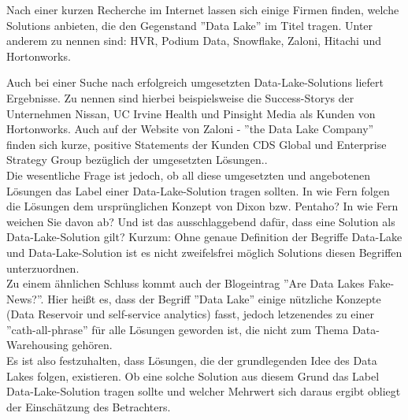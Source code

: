 \documentclass[twoside,twocolumn]{article}
\begin{document}
Nach einer kurzen Recherche im Internet lassen sich einige Firmen finden, welche Solutions anbieten, die den Gegenstand ''Data Lake'' im Titel tragen. Unter anderem zu nennen sind: HVR, Podium Data, Snowflake, Zaloni\cite{c1}, Hitachi\cite{c2} und Hortonworks\cite{c3}.

Auch bei einer Suche nach erfolgreich umgesetzten Data-Lake-Solutions liefert Ergebnisse. 
Zu nennen sind hierbei beispielsweise die Success-Storys der Unternehmen Nissan\cite{s1}, UC Irvine Health\cite{s2} und Pinsight Media\cite{s3} als Kunden von Hortonworks. Auch auf der Website von Zaloni - ''the Data Lake Company'' finden sich kurze, positive Statements der Kunden CDS Global und Enterprise Strategy Group bezüglich der umgesetzten Lösungen.\cite{s4}.\\

Die wesentliche Frage ist jedoch, ob all diese umgesetzten und angebotenen Lösungen das Label einer Data-Lake-Solution tragen sollten. In wie Fern folgen die Lösungen dem ursprünglichen Konzept von Dixon bzw. Pentaho? In wie Fern weichen Sie davon ab? Und ist das ausschlaggebend dafür, dass eine Solution als Data-Lake-Solution gilt? Kurzum: Ohne genaue Definition der Begriffe Data-Lake und Data-Lake-Solution ist es nicht zweifelsfrei möglich Solutions diesen Begriffen unterzuordnen.\\
Zu einem ähnlichen Schluss kommt auch der Blogeintrag ''Are Data Lakes Fake-News?''. Hier heißt es, dass der Begriff ''Data Lake'' einige nützliche Konzepte (Data Reservoir und self-service analytics) fasst, jedoch letzenendes zu einer ''cath-all-phrase'' für alle Lösungen geworden ist, die nicht zum Thema Data-Warehousing gehören.\cite{src4}\\

Es ist also festzuhalten, dass Lösungen, die der grundlegenden Idee des Data Lakes folgen, existieren. Ob eine solche Solution aus diesem Grund das Label Data-Lake-Solution tragen sollte und welcher Mehrwert sich daraus ergibt obliegt der Einschätzung des Betrachters.










\end{document}
